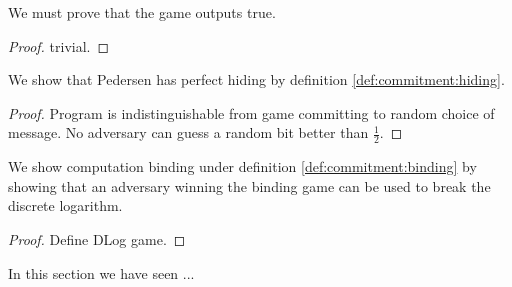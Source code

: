 \begin{lemma}
  We must prove that the game outputs true.
\end{lemma}
\begin{proof}
trivial.
\end{proof}

\begin{lemma}
  We show that Pedersen has perfect hiding by definition
  \ref{def:commitment:hiding}.
\end{lemma}
\begin{proof}
  Program is indistinguishable from game committing to random choice of message.
  No adversary can guess a random bit better than $\frac{1}{2}$.
\end{proof}

\begin{lemma}
  We show computation binding under definition \ref{def:commitment:binding} by
  showing that an adversary winning the binding game can be used to break the
  discrete logarithm.
\end{lemma}
\begin{proof}
  Define DLog game.
\end{proof}

In this section we have seen ...

